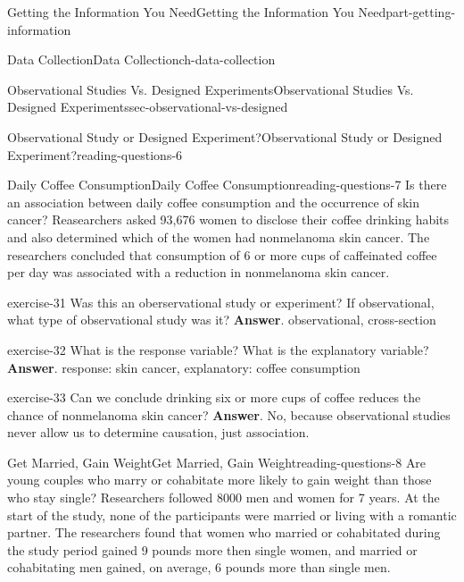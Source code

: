 \documentclass[oneside,10pt,]{book}
\numberwithin{equation}{section}
\begin{document}
\begin{partptx}{Getting the Information You Need}{}{Getting the Information You Need}{}{}{part-getting-information}
\begin{chapterptx}{Data Collection}{}{Data Collection}{}{}{ch-data-collection}
\begin{sectionptx}{Observational Studies Vs. Designed Experiments}{}{Observational Studies Vs. Designed Experiments}{}{}{sec-observational-vs-designed}
\begin{reading-questions-subsection-numberless}{Observational Study or Designed Experiment?}{}{Observational Study or Designed Experiment?}{}{}{reading-questions-6}
\end{reading-questions-subsection-numberless}
%
%
\typeout{************************************************}
\typeout{************************************************}
%
\begin{reading-questions-subsection-numberless}{Daily Coffee Consumption}{}{Daily Coffee Consumption}{}{}{reading-questions-7}
\hypertarget{p-7}{}%
Is there an association between daily coffee consumption and the occurrence of skin cancer? Reasearchers asked 93,676 women to disclose their coffee drinking habits and also determined which of the women had nonmelanoma skin cancer. The researchers concluded that consumption of 6 or more cups of caffeinated coffee per day was associated with a reduction in nonmelanoma skin cancer.%
\begin{divisionexercise}{1}{}{}{exercise-31}%
Was this an oberservational study or experiment? If observational, what type of observational study was it? \textbf{Answer}.\hypertarget{answer-31}{}\quad%
observational, cross-section\end{divisionexercise}%
\begin{divisionexercise}{2}{}{}{exercise-32}%
What is the response variable? What is the explanatory variable? \textbf{Answer}.\hypertarget{answer-32}{}\quad%
response: skin cancer, explanatory: coffee consumption\end{divisionexercise}%
\begin{divisionexercise}{3}{}{}{exercise-33}%
Can we conclude drinking six or more cups of coffee reduces the chance of nonmelanoma skin cancer? \textbf{Answer}.\hypertarget{answer-33}{}\quad%
No, because observational studies never allow us to determine causation, just association.\end{divisionexercise}%
\end{reading-questions-subsection-numberless}
%
%
\typeout{************************************************}
\typeout{************************************************}
%
\begin{reading-questions-subsection-numberless}{Get Married, Gain Weight}{}{Get Married, Gain Weight}{}{}{reading-questions-8}
\hypertarget{p-8}{}%
Are young couples who marry or cohabitate more likely to gain weight than those who stay single? Researchers followed 8000 men and women for 7 years. At the start of the study, none of the participants were married or living with a romantic partner. The researchers found that women who married or cohabitated during the study period gained 9 pounds more then single women, and married or cohabitating men gained, on average, 6 pounds more than single men.%

\end{reading-questions-subsection-numberless}
\end{sectionptx}
\end{chapterptx}
\end{partptx}
\end{document}
